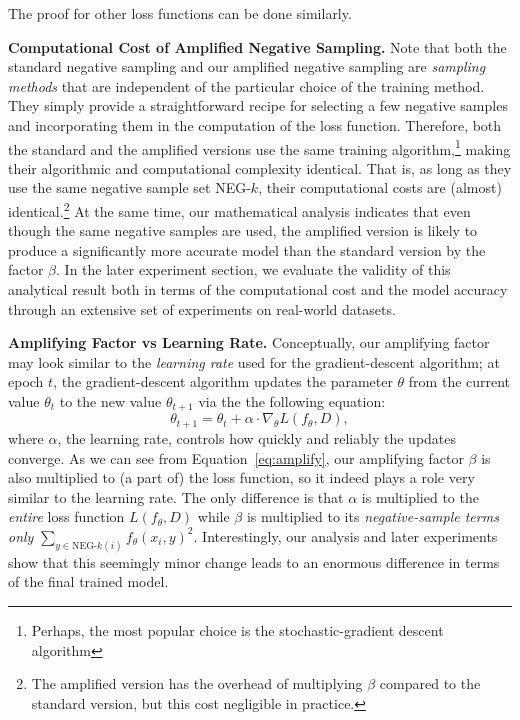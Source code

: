 The proof for other loss functions can be done similarly.

\textbf{Computational Cost of Amplified Negative Sampling.} 
Note that both the standard negative sampling and our amplified negative sampling are \emph{sampling methods} that are independent of the particular choice of the training method. They simply provide a straightforward recipe for selecting a few negative samples and incorporating them in the computation of the loss function. Therefore, both the standard and the amplified versions use the same training algorithm,\footnote{Perhaps, the most popular choice is the stochastic-gradient descent algorithm} making their algorithmic and computational complexity identical. That is, as long as they use the same negative sample set NEG-$k$, their computational costs are (almost) identical.\footnote{The amplified version has the overhead of multiplying $\beta$ compared to the standard version, but this cost negligible in practice.} At the same time, our mathematical analysis indicates that even though the same negative samples are used, the amplified version is likely to produce a significantly more accurate model than the standard version by the factor $\beta$. In the later experiment section, we evaluate the validity of this analytical result both in terms of the computational cost and the model accuracy through an extensive set of experiments on real-world datasets. 

\textbf{Amplifying Factor vs Learning Rate.} Conceptually, our amplifying factor may look similar to the \emph{learning rate} used for the gradient-descent algorithm; at epoch $t$, the gradient-descent algorithm updates the parameter $\theta$ from the current value $\theta_{t}$ to the new value $\theta_{t+1}$ via the the following equation:
\small
\begin{equation}
\theta_{t+1} = \theta_{t} + \alpha \cdot \nabla_{\theta} L(f_{\theta},D),
\end{equation}
\normalsize
where $\alpha$, the learning rate, controls how quickly and reliably the updates converge. 
As we can see from Equation~\ref{eq:amplify}, our amplifying factor $\beta$ is also multiplied to (a part of) the loss function, so it indeed plays a role very similar to the learning rate. The only difference is that $\alpha$ is multiplied to the \emph{entire} loss function $L(f_{\theta},D)$ while $\beta$ is multiplied to its \emph{negative-sample terms only} $\sum_{y \in \text{NEG-$k$}(i)} f_{\theta}(x_i, y)^2$.  
Interestingly, our analysis and later experiments show that this seemingly minor change leads to an enormous difference in terms of the final trained model.

